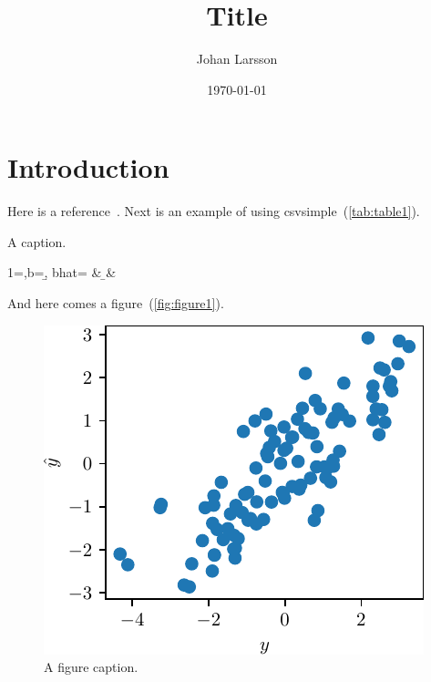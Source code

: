 \documentclass[english,a4paper]{article}
\title{Title}
\author{Johan Larsson}
\affil{The Department of Statistics, Lund University}
\date{\today}
\begin{document}
\maketitle

\begin{abstract}
\end{abstract}

\hypertarget{introduction}{%
  \section{Introduction}\label{introduction}}

Here is a reference~\autocite{larsson2020c}. Next is an example of using
csvsimple~(\autoref{tab:table1}).

\begin{table}[hbtp]
  \caption{A caption.\label{tab:table1}}
  {1=\measure,b=\b, bhat=\bhat}%
  {\measure & \b & \bhat}
\end{table}

And here comes a figure~(\autoref{fig:figure1}).

\begin{figure}[hbtp]
  \centering
  \includegraphics{figures/plot.pdf}
  \caption{A figure caption.\label{fig:figure1}}
\end{figure}

\printbibliography
\end{document}
